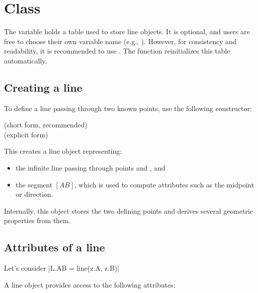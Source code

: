 \newpage
\section{Class } %

The variable  holds a table used to store line objects. It is optional, and users are free to choose their own variable name (e.g., ).
However, for consistency and readability, it is recommended to use . The function  reinitializes this table automatically.


\subsection{Creating a line}
\label{sub:creating_a_line}

To define a line passing through two known points, use the following constructor:

\begin{mybox}
   \hfill (short form, recommended)\\
   \hfill (explicit form)
\end{mybox}

This creates a line object  representing:
\begin{itemize}
  \item the infinite line passing through points  and , and
  \item the segment $[AB]$, which is used to compute attributes such as the midpoint or direction.
\end{itemize}

\medskip

Internally, this object stores the two defining points and derives several geometric properties from them.

\subsection{Attributes of a line} %

Let's consider  |L.AB = line(z.A, z.B)|

A line object provides access to the following attributes:

